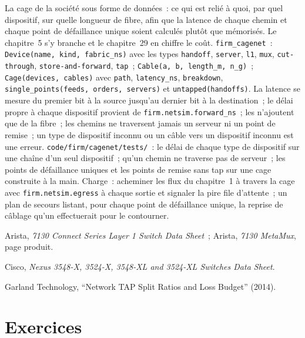 \begin{build}
 La cage de la société sous forme de données~: ce qui est relié à quoi, par quel dispositif, sur quelle longueur de fibre, afin que la latence de chaque chemin
et chaque point de défaillance unique soient calculés plutôt que mémorisés. Le chapitre~5 s'y branche et le chapitre~29 en chiffre le coût.
 \texttt{firm\_cagenet}~: \texttt{Device(name, kind, fabric\_ns)} avec les types \texttt{handoff}, \texttt{server},
\texttt{l1}, \texttt{mux}, \texttt{cut-through}, \texttt{store-and-forward}, \texttt{tap}~; \texttt{Cable(a, b, length\_m, n\_g)}~;
\texttt{Cage(devices, cables)} avec \texttt{path}, \texttt{latency\_ns}, \texttt{breakdown},
\texttt{single\_points(feeds, orders, servers)} et \texttt{untapped(handoffs)}.
 La latence se mesure du premier bit à la source jusqu'au dernier bit à la destination~; le délai propre à chaque dispositif provient de
\texttt{firm.netsim.forward\_ns}~; les  n'ajoutent que de la fibre~; les chemins ne traversent jamais un serveur ni un point de remise~; un type de dispositif inconnu ou un câble vers un
dispositif inconnu est une erreur.
 \texttt{code/firm/cagenet/tests/}~: le délai de chaque type de dispositif sur une chaîne d'un seul dispositif~; qu'un chemin ne
traverse pas de serveur~; les points de défaillance uniques et les points de remise sans tap sur une cage construite à la main.
 Charge~: acheminer les flux du chapitre~1 à travers la cage avec \texttt{firm.netsim.egress} à chaque sortie et signaler la
pire file d'attente~; un plan de secours listant, pour chaque point de défaillance unique, la reprise de câblage qu'un  effectuerait pour le contourner.
\end{build}

\begin{omsources}
\item Arista, \emph{7130 Connect Series Layer 1 Switch Data Sheet}~; Arista, \emph{7130 MetaMux}, page produit.
\item Cisco, \emph{Nexus 3548-X, 3524-X, 3548-XL and 3524-XL Switches Data Sheet}.
\item Garland Technology, ``Network TAP Split Ratios and Loss Budget'' (2014).
\end{omsources}

\section{Exercices}


